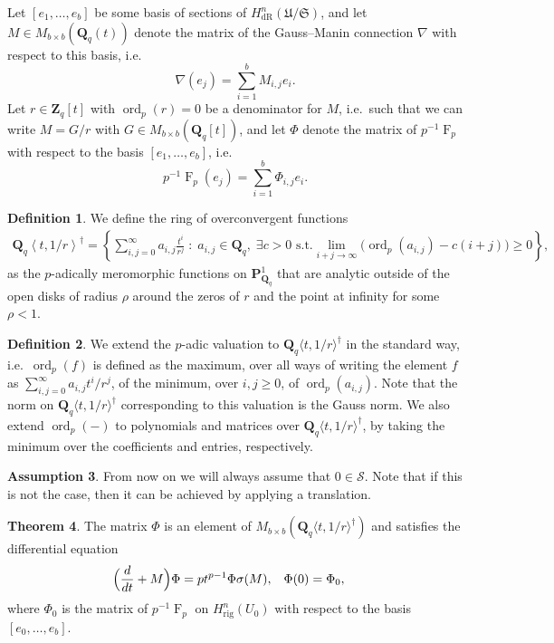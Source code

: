 \documentclass[a4paper,11pt]{article}
\numberwithin{equation}{section}
\newcommand{\ZZ}{\mathbf{Z}} %
\newcommand{\QQ}{\mathbf{Q}} %
\DeclareMathOperator{\ord}{ord}          %
\DeclareMathOperator{\Frob}{F}           %
\providecommand{\HdR}{H_{\text{dR}}}    %
\providecommand{\Hrig}{H_{\text{rig}}}  %
\theoremstyle{definition}
\newtheorem{thm}{Theorem}[section]
\newtheorem{defn}[thm]{Definition}
\newtheorem{assump}[thm]{Assumption}
\begin{document}
Let $[e_1, \dotsc, e_b]$ be some basis of sections of 
$\HdR^n(\mathfrak{U}/\mathfrak{S})$, and let $M \in M_{b \times b}(\QQ_q(t))$ 
denote the matrix of the Gauss--Manin connection $\nabla$ with respect 
to this basis, i.e.
\[
\nabla (e_j) = \sum_{i=1}^b M_{i,j} e_i.
\]
Let $r \in \ZZ_q[t]$ with $\ord_p(r)=0$ be a denominator for $M$, i.e.\ such that we can write 
$M = G/r$ with $G \in M_{b \times b}(\QQ_q[t])$, and let $\Phi$ denote the 
matrix of $p^{-1}\Frob_p$ with respect to the basis $[e_1, \dotsc, e_b]$, i.e.\
\[
p^{-1} \Frob_p (e_j) = \sum_{i=1}^b \Phi_{i,j} e_i.
\]

\begin{defn}
We define the ring of overconvergent functions
\begin{align*}
\QQ_q \left\langle t, 1/r \right\rangle^{\dag} = 
\left\{\sum_{i,j=0}^{\infty} a_{i,j} \frac{t^i}{r^j} \; : \; 
a_{i,j} \in \QQ_q, \; \exists c > 0 \text{ s.t.}  
\lim_{i+j \rightarrow \infty} \bigl(\ord_p(a_{i,j}) - c(i+j)\bigr) \geq 0
\right\},
\end{align*}
as the $p$-adically meromorphic functions on $\mathbf{P}^1_{\QQ_q}$ that are 
analytic outside of the open disks of radius $\rho$ around the zeros of $r$ 
and the point at infinity for some $\rho<1$. 
\end{defn}

\begin{defn}
We extend the $p$-adic valuation 
to $\QQ_q \langle t, 1/r \rangle^{\dag}$ in the standard way, i.e.\ 
$\ord_p(f)$ is defined as the maximum, over all ways of writing the element $f$ as
$\sum_{i,j=0}^{\infty} a_{i,j} t^i / r^j$,
of the minimum, over $i,j \geq 0$, of $\ord_p(a_{i,j})$. Note that the  
norm on $\QQ_q \langle t, 1/r \rangle^{\dag}$ corresponding to this valuation
is the Gauss norm. We also extend $\ord_p(-)$ to polynomials and matrices over 
$\QQ_q \langle t, 1/r \rangle^{\dag}$, by taking the 
minimum over the coefficients and entries, respectively.
\end{defn}

\begin{assump} \label{assump:S}
From now on we will always assume that $0 \in \mathcal{S}$. 
Note that if this is not the case, then it can be achieved by 
applying a translation.
\end{assump}

\begin{thm} \label{thm:eqphi} 
The matrix $\Phi$ is an element of 
$M_{b \times b}(\QQ_q \langle t, 1/r \rangle^{\dag})$ 
and satisfies the differential equation
\begin{align*}
\Bigl(\frac{d}{dt} + M\Bigr) \Phi &= p t^{p-1} \Phi \sigma(M), &\Phi(0)& = \Phi_0,
\end{align*}
where $\Phi_0$ is the 
matrix of $p^{-1}\Frob_p$ on $\Hrig^n(U_0)$ with respect to the 
basis $[e_0,\dotsc,e_b]$.
\end{thm}
\end{document}
